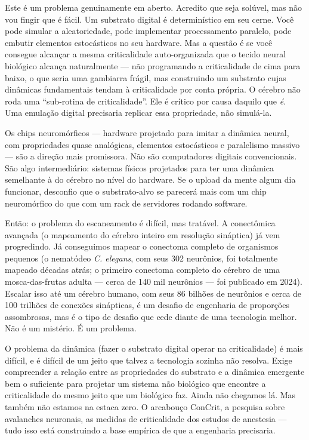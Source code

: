 \documentclass[11pt, twoside, openright]{book}
\begin{document}
Este é um problema genuinamente em aberto. Acredito que seja solúvel, mas não vou fingir que é fácil. Um substrato digital é determinístico em seu cerne. Você pode simular a aleatoriedade, pode implementar processamento paralelo, pode embutir elementos estocásticos no seu hardware. Mas a questão é se você consegue alcançar a mesma criticalidade auto-organizada que o tecido neural biológico alcança naturalmente --- não programando a criticalidade de cima para baixo, o que seria uma gambiarra frágil, mas construindo um substrato cujas dinâmicas fundamentais tendam à criticalidade por conta própria. O cérebro não roda uma ``sub-rotina de criticalidade''. Ele é crítico por causa daquilo que \textit{é}. Uma emulação digital precisaria replicar essa propriedade, não simulá-la.

Os chips neuromórficos --- hardware projetado para imitar a dinâmica neural, com propriedades quase analógicas, elementos estocásticos e paralelismo massivo --- são a direção mais promissora. Não são computadores digitais convencionais. São algo intermediário: sistemas físicos projetados para ter uma dinâmica semelhante à do cérebro no nível do hardware. Se o upload da mente algum dia funcionar, desconfio que o substrato-alvo se parecerá mais com um chip neuromórfico do que com um rack de servidores rodando software.

Então: o problema do escaneamento é difícil, mas tratável. A conectômica avançada (o mapeamento do cérebro inteiro em resolução sináptica) já vem progredindo. Já conseguimos mapear o conectoma completo de organismos pequenos (o nematódeo \textit{C. elegans}, com seus 302 neurônios, foi totalmente mapeado décadas atrás; o primeiro conectoma completo do cérebro de uma mosca-das-frutas adulta --- cerca de 140 mil neurônios --- foi publicado em 2024). Escalar isso até um cérebro humano, com seus 86 bilhões de neurônios e cerca de 100 trilhões de conexões sinápticas, é um desafio de engenharia de proporções assombrosas, mas é o tipo de desafio que cede diante de uma tecnologia melhor. Não é um mistério. É um problema.

O problema da dinâmica (fazer o substrato digital operar na criticalidade) é mais difícil, e é difícil de um jeito que talvez a tecnologia sozinha não resolva. Exige compreender a relação entre as propriedades do substrato e a dinâmica emergente bem o suficiente para projetar um sistema não biológico que encontre a criticalidade do mesmo jeito que um biológico faz. Ainda não chegamos lá. Mas também não estamos na estaca zero. O arcabouço ConCrit, a pesquisa sobre avalanches neuronais, as medidas de criticalidade dos estudos de anestesia --- tudo isso está construindo a base empírica de que a engenharia precisaria.
\end{document}
